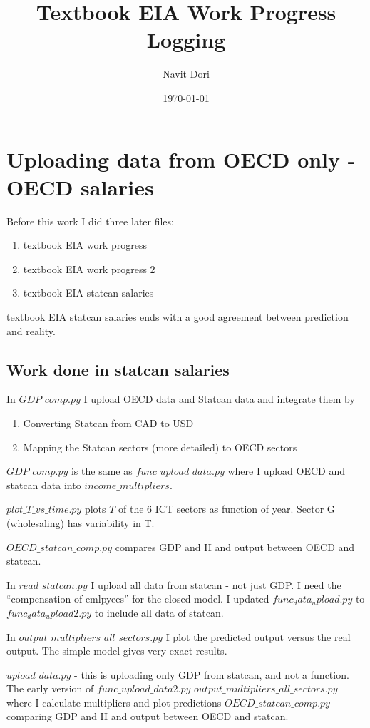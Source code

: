 \documentclass[12pt]{article}
\title{Textbook EIA Work Progress Logging}
\author{Navit Dori}
\date{\today}
\begin{document}
\maketitle


\section{Uploading data from OECD only - OECD salaries}
Before this work I did three later files:
\begin{enumerate}
    \item textbook EIA work progress
    \item textbook EIA work progress 2
    \item textbook EIA statcan salaries
\end{enumerate}

textbook EIA statcan salaries ends with a good agreement between prediction and reality.


\subsection{Work done in statcan salaries}
In $GDP\_comp.py$ I upload OECD data and Statcan data and integrate them by
\begin{enumerate}
    \item Converting Statcan from CAD to USD
    \item Mapping the Statcan sectors (more detailed) to OECD sectors
\end{enumerate}

$GDP\_comp.py$ is the same as $func\_upload\_data.py$ where I upload OECD and statcan data into $income\_multipliers$.

$plot\_T\_vs\_time.py$ plots $T$ of the $6$ ICT sectors as function of year. Sector G (wholesaling) has variability in T.
 
$OECD\_statcan\_comp.py$ compares GDP and II and output between OECD and statcan. 

In $read\_statcan.py$ I upload all data from statcan - not just GDP. I need the ``compensation of emlpyees'' for the closed model.
I updated $func_data_upload.py$ to $func_data_upload2.py$ to include all data of statcan. 
 
In $output\_multipliers\_all\_sectors.py$ I plot the predicted output versus the real output.
The simple model gives very exact results.
 
 $upload\_data.py$ - this is uploading only GDP from statcan, and not a function. The early version of $func\_upload\_data2.py$
$output\_multipliers\_all\_sectors.py$ where I calculate multipliers and plot predictions
$OECD\_statcan\_comp.py$ comparing GDP and II and output between OECD and statcan. 
\end{document}
